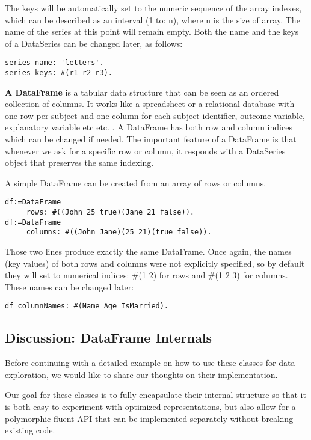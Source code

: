 \documentclass[sigplan]{acmart}
\makeatletter
\newcommand*{\etc}{%
    \@ifnextchar{.}%
        {etc}%
        {etc.\@\xspace}%
}
\makeatother
\begin{document}
The keys will be automatically set to the numeric sequence of the array indexes, which can be described as an interval (1 to: n), where n is the size of array. The name of the series at this point will remain empty. Both the name and the keys of a DataSeries can be changed later, as follows:

\begin{lstlisting}[basicstyle=\small,language=Smalltalk]
series name: 'letters'.
series keys: #(r1 r2 r3).
\end{lstlisting}

\textbf{A DataFrame} is a tabular data structure that can be seen as an ordered collection of columns. It works like a spreadsheet or a relational database with one row per subject and one column for each subject identifier, outcome variable, explanatory variable \etc. A DataFrame has both row and column indices which can be changed if needed. The important feature of a DataFrame is that whenever we ask for a specific row or column, it responds with a DataSeries object that preserves the same indexing.

A simple DataFrame can be created from an array of rows or columns.

\begin{lstlisting}[basicstyle=\small,language=Smalltalk]
df:=DataFrame 
     rows: #((John 25 true)(Jane 21 false)).
df:=DataFrame 
     columns: #((John Jane)(25 21)(true false)).
\end{lstlisting}

Those two lines produce exactly the same DataFrame. Once again, the names (key values) of both rows and columns were not explicitly specified, so by default they will set to numerical indices: \#(1 2) for rows and \#(1 2 3) for columns. These names can be changed later:

\begin{lstlisting}[basicstyle=\small,language=Smalltalk]
df columnNames: #(Name Age IsMarried).
\end{lstlisting}

\subsection*{Discussion: DataFrame Internals}
\label{sec:internals}

Before continuing with a detailed example on how to use these classes for data exploration, we would like to share our thoughts on their implementation. 

Our goal for these classes is to fully encapsulate their internal structure so that it is both easy to experiment with optimized  representations, but also allow for a polymorphic fluent API that can be implemented separately without breaking existing code. 
\end{document}
